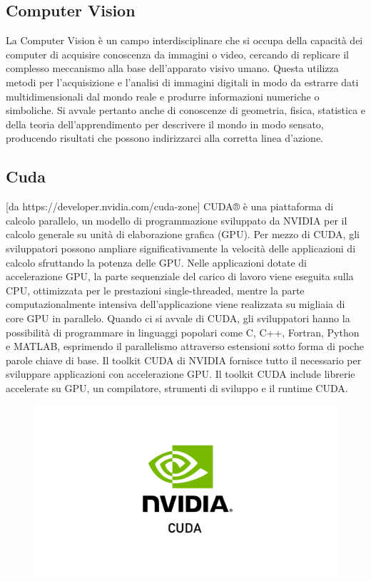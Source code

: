 \subsection{Computer Vision}
La Computer Vision è un campo interdisciplinare che si occupa della capacità dei computer di acquisire conoscenza da immagini o video, cercando di replicare il complesso meccanismo alla base dell'apparato visivo umano. 
Questa utilizza metodi per l'acquisizione e l'analisi di immagini digitali in modo da estrarre dati multidimensionali dal mondo reale e produrre informazioni numeriche o simboliche. 
Si avvale pertanto anche di conoscenze di geometria, fisica, statistica e della teoria dell'apprendimento per descrivere il mondo in modo sensato, producendo risultati che possono indirizzarci alla corretta linea d'azione.

\subsection{Cuda}
[da https://developer.nvidia.com/cuda-zone]
CUDA® è una piattaforma di calcolo parallelo, un modello di programmazione sviluppato da NVIDIA per il calcolo generale su unità di elaborazione grafica (GPU). 
Per mezzo di CUDA, gli sviluppatori possono ampliare significativamente la velocità delle applicazioni di calcolo sfruttando la potenza delle GPU.
Nelle applicazioni dotate di accelerazione GPU, la parte sequenziale del carico di lavoro viene eseguita sulla CPU, ottimizzata per le prestazioni single-threaded, mentre la parte computazionalmente intensiva dell’applicazione viene realizzata su migliaia di core GPU in parallelo. 
Quando ci si avvale di CUDA, gli sviluppatori hanno la possibilità di programmare in linguaggi popolari come C, C++, Fortran, Python e MATLAB, esprimendo il parallelismo attraverso estensioni sotto forma di poche parole chiave di base.
Il toolkit CUDA di NVIDIA fornisce tutto il necessario per sviluppare applicazioni con accelerazione GPU.
Il toolkit CUDA include librerie accelerate su GPU, un compilatore, strumenti di sviluppo e il runtime CUDA.

\begin{figure}
    \begin{center}    
        \includegraphics[width=0.34\linewidth]{images/image1.png}
    \end{center}
\end{figure}

